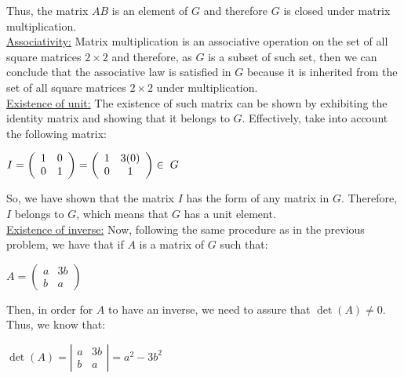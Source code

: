 \documentclass[a4paper,openany,11pt]{book}
\begin{document}
Thus, the matrix $AB$ is an element of $G$ and therefore $G$ is closed under matrix multiplication.\\

\underline{Associativity:} Matrix multiplication is an associative operation on the set of all square matrices $2\times2$ and therefore, as $G$ is a subset of such set, then we can conclude that the associative law is satisfied in $G$ because it is inherited from the set of all square matrices $2\times2$ under multiplication.\\

\underline{Existence of unit:} The existence of such matrix can be shown by exhibiting the identity matrix and showing that it belongs to $G$. Effectively, take into account the following matrix:

\begin{center}
	$I = \left(\begin{array}{cc}
		1 & 0\\
		0 & 1
	\end{array}\right) = \left(\begin{array}{cc}
	1 & 3(0)\\
	0 & 1
\end{array}\right) \in \hspace{0.1cm} G$
\end{center}

So, we have shown that the matrix $I$ has the form of any matrix in $G$. Therefore, $I$ belongs to $G$, which means that $G$ has a unit element.\\

\underline{Existence of inverse:} Now, following the same procedure as in the previous problem, we have that if $A$ is a matrix of $G$ such that:

\begin{center}
	$A = \left(\begin{array}{cc}
	a & 3b\\
	b & a
	\end{array}\right)$
\end{center}

Then, in order for $A$ to have an inverse, we need to assure that $\det(A) \neq 0$. Thus, we know that:

\begin{center}
	$\det(A) = \left|\begin{array}{cc}
	a & 3b\\
	b & a
	\end{array}\right| = a^{2} - 3b^{2}$
\end{center}
\end{document}
